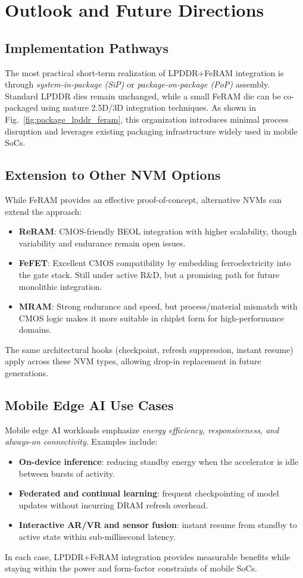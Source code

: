 \section{Outlook and Future Directions}

\subsection{Implementation Pathways}
The most practical short-term realization of LPDDR+FeRAM integration is through \emph{system-in-package (SiP)} or \emph{package-on-package (PoP)} assembly. 
Standard LPDDR dies remain unchanged, while a small FeRAM die can be co-packaged using mature 2.5D/3D integration techniques.
As shown in Fig.~\ref{fig:package_lpddr_feram}, this organization introduces minimal process disruption and leverages existing packaging infrastructure widely used in mobile SoCs.

\subsection{Extension to Other NVM Options}
While FeRAM provides an effective proof-of-concept, alternative NVMs can extend the approach:
\begin{itemize}
  \item \textbf{ReRAM}: CMOS-friendly BEOL integration with higher scalability, though variability and endurance remain open issues.
  \item \textbf{FeFET}: Excellent CMOS compatibility by embedding ferroelectricity into the gate stack. Still under active R\&D, but a promising path for future monolithic integration.
  \item \textbf{MRAM}: Strong endurance and speed, but process/material mismatch with CMOS logic makes it more suitable in chiplet form for high-performance domains.
\end{itemize}
The same architectural hooks (checkpoint, refresh suppression, instant resume) apply across these NVM types, allowing drop-in replacement in future generations.

\subsection{Mobile Edge AI Use Cases}
Mobile edge AI workloads emphasize \emph{energy efficiency, responsiveness, and always-on connectivity}. 
Examples include:
\begin{itemize}
  \item \textbf{On-device inference}: reducing standby energy when the accelerator is idle between bursts of activity.
  \item \textbf{Federated and continual learning}: frequent checkpointing of model updates without incurring DRAM refresh overhead.
  \item \textbf{Interactive AR/VR and sensor fusion}: instant resume from standby to active state within sub-millisecond latency.
\end{itemize}
In each case, LPDDR+FeRAM integration provides measurable benefits while staying within the power and form-factor constraints of mobile SoCs.


